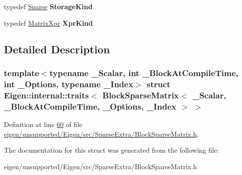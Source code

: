 \begin{DoxyCompactItemize}
typedef \hyperlink{struct_eigen_1_1_sparse}{Sparse} {\bfseries Storage\+Kind}
\item 
\mbox{\label{struct_eigen_1_1internal_1_1traits_3_01_block_sparse_matrix_3_01___scalar_00_01___block_at_compibd5ca3edcdbc62bf01222bcf3326c5bd_a11e3e60bb946bab8d9ede5359faf9562}} 
typedef \hyperlink{struct_eigen_1_1_matrix_xpr}{Matrix\+Xpr} {\bfseries Xpr\+Kind}
\end{DoxyCompactItemize}


\subsection{Detailed Description}
\subsubsection*{template$<$typename \+\_\+\+Scalar, int \+\_\+\+Block\+At\+Compile\+Time, int \+\_\+\+Options, typename \+\_\+\+Index$>$\newline
struct Eigen\+::internal\+::traits$<$ Block\+Sparse\+Matrix$<$ \+\_\+\+Scalar, \+\_\+\+Block\+At\+Compile\+Time, \+\_\+\+Options, \+\_\+\+Index $>$ $>$}



Definition at line \hyperlink{eigen_2unsupported_2_eigen_2src_2_sparse_extra_2_block_sparse_matrix_8h_source_l00060}{60} of file \hyperlink{eigen_2unsupported_2_eigen_2src_2_sparse_extra_2_block_sparse_matrix_8h_source}{eigen/unsupported/\+Eigen/src/\+Sparse\+Extra/\+Block\+Sparse\+Matrix.\+h}.



The documentation for this struct was generated from the following file\+:\begin{DoxyCompactItemize}
\item 
eigen/unsupported/\+Eigen/src/\+Sparse\+Extra/\+Block\+Sparse\+Matrix.\+h\end{DoxyCompactItemize}
